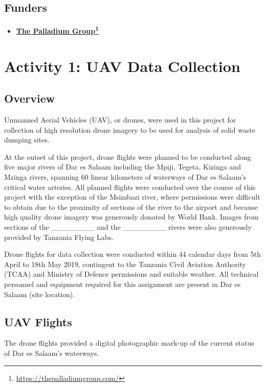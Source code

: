 \documentclass[a4paper,12pt,twoside]{article}
\begin{document}
\subsection{Funders}

    \begin{itemize}
        \item \textbf{\href{https://thepalladiumgroup.com/}{The Palladium Group}\footnote{\url{https://thepalladiumgroup.com/}}}
        
        \lipsum[0-1]
    \end{itemize}   

\section{Activity 1: UAV Data Collection}

\subsection{Overview}
    Unmanned Aerial Vehicles (UAV), or drones, were used in this project for collection of high resolution drone imagery to be used for analysis of solid waste dumping sites.
    
    At the outset of this project, drone flights were planned to be  conducted along five major rivers of Dar es Salaam including the Mpiji, Tegeta, Kizinga and Mzinga rivers, spanning 60 linear kilometers of waterways of Dar es Salaam’s critical water arteries. All planned flights were conducted over the course of this project with the exception of the Msimbazi river, where permissions were difficult to obtain due to the proximity of sections of the river to the airport and because high quality drone imagery was generously donated by World Bank. Images from sections of the ________ and the ________ rivers were also generously provided by Tanzania Flying Labs.
    
    Drone flights for data collection were conducted within 44 calendar days from 5th April to 18th May 2019, contingent to the Tanzania Civil Aviation Authority (TCAA) and Ministry of Defence permissions and suitable weather. All technical personnel and equipment required for this assignment are present in Dar es Salaam (site location). 

\subsection{UAV Flights}
    The drone flights provided a digital photographic mark-up of the current status of Dar es Salaam’s waterways. 
    
\end{document}
